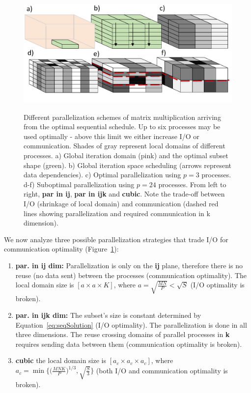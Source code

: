 \documentclass[sigplan,review,anonymous]{acmart}\settopmatter{printfolios=true,printccs=false,printacmref=false}
\begin{document}
 \begin{figure}
	\includegraphics[width=\columnwidth]{figures/mmm_parallelization}
	\label{fig:mmmParallelization}
	\caption{Different parallelization schemes of matrix multiplication 
	arriving from the optimal sequential schedule. Up to six processes may be 
	used optimally - above this limit we either increase I/O or communication. 
	Shades of gray represent local domains of different processes. a) Global 
	iteration domain (pink) and the optimal subset shape (green). b) Global 
	iteration space scheduling (arrows represent data dependencies). c) Optimal 
	parallelization using $p=3$ processes. d-f) Suboptimal parallelization 
	using $p=24$ processes. From left to right, \textbf{par in ij}, \textbf{par 
	in ijk} and \textbf{cubic}. Note the trade-off between I/O (shrinkage of 
	local domain) and communication (dashed red lines showing parallelization 
	and required communication in k dimension).} 
\end{figure}

We now analyze three possible parallelization strategies that trade I/O for 
communication optimality (Figure~\ref{fig:mmmParallelization}):

\begin{enumerate}
	\item \textbf{par. in ij dim:} 
	Parallelization is only on the \textbf{ij} plane, therefore there is no 
	reuse 
	(no data sent) 
	between the processes (communication optimality). The local domain size is 
	$[a \times a \times K]$, where $a = \sqrt{\frac{MN}{P}} < \sqrt{S}$  (I/O 
	optimality is broken).
	\item \textbf{par. in ijk dim:} The subset's size is 
	constant determined by 
	Equation~\ref{eq:seqSolution} (I/O optimality). The parallelization is done 
	in all 
	three dimensions. The reuse crossing domains of parallel processes in 
	\textbf{k} 
	requires sending data between them (communication optimality 
	is broken).
	\item \textbf{cubic} 
	the local domain size is 
	$[a_c \times a_c \times a_c]$, where $a_c = 
	\min\Big\{\big(\frac{MNK}{P}\big)^{1/3}, 
	\sqrt{\frac{S}{3}}\Big\}$ (both I/O and communication 
	optimality is broken).
\end{enumerate}
\end{document}
